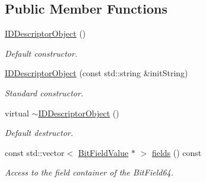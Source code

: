 \subsection*{Public Member Functions}
\begin{DoxyCompactItemize}
\item 
\hyperlink{class_d_d4hep_1_1_geometry_1_1_i_d_descriptor_object_a42a00825ff023bcce96505e616599e94}{I\+D\+Descriptor\+Object} ()
\begin{DoxyCompactList}\small\item\em Default constructor. \end{DoxyCompactList}\item 
\hyperlink{class_d_d4hep_1_1_geometry_1_1_i_d_descriptor_object_a9255ad3ebfdcc22225b2ca01cfd99442}{I\+D\+Descriptor\+Object} (const std\+::string \&init\+String)
\begin{DoxyCompactList}\small\item\em Standard constructor. \end{DoxyCompactList}\item 
virtual \hyperlink{class_d_d4hep_1_1_geometry_1_1_i_d_descriptor_object_ab2e22dcf33d24f258e82973d9851474d}{$\sim$\+I\+D\+Descriptor\+Object} ()
\begin{DoxyCompactList}\small\item\em Default destructor. \end{DoxyCompactList}\item 
const std\+::vector$<$ \hyperlink{class_d_d4hep_1_1_d_d_segmentation_1_1_bit_field_value}{Bit\+Field\+Value} $\ast$ $>$ \hyperlink{class_d_d4hep_1_1_geometry_1_1_i_d_descriptor_object_a303d86365e897cb475140b1dbadd7ee4}{fields} () const
\begin{DoxyCompactList}\small\item\em Access to the field container of the Bit\+Field64. \end{DoxyCompactList}\end{DoxyCompactItemize}
